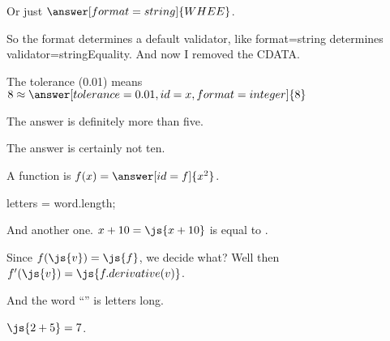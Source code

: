 \documentclass{ximera}
\begin{document}
\begin{problem}
  Or just $\answer[format=string]{WHEE}$.

  So the format determines a default validator, like format=string determines validator=stringEquality.  And now I removed the CDATA.
\end{problem}


\begin{problem}



  The tolerance (0.01) means $8 \approx \answer[tolerance=0.01,id=x,format=integer]{8}$
  
  \begin{feedback}
    The answer is definitely more than five.
  \end{feedback}

  \begin{feedback}[x==10]
    The answer is certainly not ten.
  \end{feedback}

  A function is $f(x) = \answer[id=f]{x^2}$.
\end{problem}

\begin{javascript}
  letters = word.length;
\end{javascript}

And another one.  $x + 10 = \js{x+10}$ is equal to .

Since $f(\js{v}) = \js{f}$, we decide what?  Well then $f'(\js{v}) = \js{f.derivative(v)}$.

And the word ``'' is  letters long.

$\js{2+5} = 7$.
\end{document}
